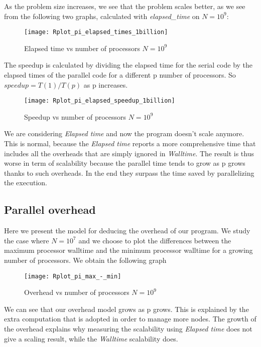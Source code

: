 \documentclass[11pt]{scrartcl} %
\begin{document}
As the problem size increases, we see that the problem scales better, as we see from the following two graphs, calculated with \textit{elapsed\_time} on $N=10^9$:
\begin{figure}[H] %
	\centering
	\texttt{[image: Rplot\_pi\_elapsed\_times\_1billion]} %
	\caption{Elapsed time vs number of processors $N= 10^9$}
\end{figure}
The speedup is calculated by dividing the elapsed time for the serial code by the elapsed times of the parallel code for a different p number of processors. So $speedup = T(1)/T(p)$ as p increases. 
\begin{figure}[H] %
	\centering
	\texttt{[image: Rplot\_pi\_elapsed\_speedup\_1billion]} %
	\caption{Speedup vs number of processors $N= 10^9$}
\end{figure}

We are considering \textit{Elapsed time} and now the program doesn't scale anymore. This is normal, because the \textit{Elapsed time} reports a more comprehensive time that includes all the overheads that are simply ignored in \textit{Walltime}. The result is thus worse in term of scalability because the parallel time tends to grow as p grows thanks to such overheads. In the end they surpass the time saved by parallelizing the execution.
\subsection{Parallel overhead}

Here we present the model for deducing the overhead of our program. We study the case where $N=10^7$ and we choose to plot the differences between the maximum processor walltime
 and the minimum processor walltime for a growing number of processors.
We obtain the following graph
\begin{figure}[H] %
	\centering
	\texttt{[image: Rplot\_pi\_max\_-\_min]} %
	\caption{Overhead vs number of processors $N= 10^9$}
\end{figure}

We can see that our overhead model grows as p grows. This is explained by the extra computation that is adopted in order to manage more nodes. The growth of the overhead explains why measuring the scalability using \textit{Elapsed time} does not give a scaling result, while the \textit{Walltime} scalability does.
\end{document}
